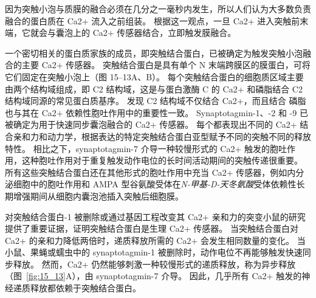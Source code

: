 因为突触小泡与质膜的融合必须在几分之一毫秒内发生，所以人们认为大多数负责融合的蛋白质在 Ca2+ 流入之前组装。
根据这一观点，一旦 Ca2+ 进入突触前末端，它就会与囊泡上的 Ca2+ 传感器结合，立即触发膜融合。


一个密切相关的蛋白质家族的成员，即突触结合蛋白，已被确定为触发突触小泡融合的主要 Ca2+ 传感器。
突触结合蛋白是具有单个 N 末端跨膜区的膜蛋白，可将它们固定在突触小泡上（图 15–13A、B）。
每个突触结合蛋白的细胞质区域主要由两个结构域组成，即 C2 结构域，这是与蛋白激酶 C 的 Ca2+ 和磷脂结合 C2 结构域同源的常见蛋白质基序。
发现 C2 结构域不仅结合 Ca2+，而且结合 磷脂也与其在 Ca2+ 依赖性胞吐作用中的重要性一致。
Synaptotagmin-1、-2 和 -9 已被确定为用于快速同步囊泡融合的 Ca2+ 传感器。
每个都表现出不同的 Ca2+ 结合亲和力和动力学，根据表达的特定突触结合蛋白亚型赋予不同的突触不同的释放特性。
相比之下，synaptotagmin-7 介导一种较慢形式的 Ca2+ 触发的胞吐作用，这种胞吐作用对于重复触发动作电位的长时间活动期间的突触传递很重要。
所有这些突触结合蛋白还在其他形式的胞吐作用中充当 Ca2+ 传感器，例如内分泌细胞中的胞吐作用和 AMPA 型谷氨酸受体在\textit{N-甲基-D-天冬氨酸}受体依赖性长期增强期间从细胞内囊泡池插入突触后细胞膜。


对突触结合蛋白-1 被删除或通过基因工程改变其 Ca2+ 亲和力的突变小鼠的研究提供了重要证据，证明突触结合蛋白是生理 Ca2+ 传感器。
当突触结合蛋白对 Ca2+ 的亲和力降低两倍时，递质释放所需的 Ca2+ 会发生相同数量的变化。
当小鼠、果蝇或蠕虫中的 synaptotagmin-1 被删除时，动作电位不再能够触发快速同步释放。
然而，Ca2+ 仍然能够刺激一种较慢形式的递质释放，称为异步释放（图~\ref{fig:15_13}A），由 synaptotagmin-7 介导。
因此，几乎所有 Ca2+ 触发的神经递质释放都依赖于突触结合蛋白。


